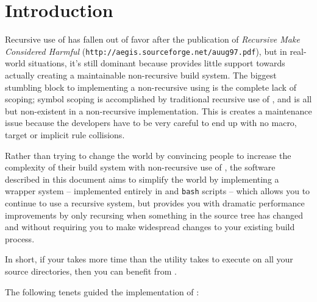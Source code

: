 %
%
%
%
\chapter{Introduction}

Recursive use of \make has fallen out of favor after the publication
of \emph{Recursive Make Considered Harmful}
(\texttt{http://aegis.sourceforge.net/auug97.pdf}), but in real-world
situations, it's still dominant because \make provides little support
towards actually creating a maintainable non-recursive build system.
The biggest stumbling block to implementing a non-recursive using
\make is the complete lack of scoping; symbol scoping is accomplished by
traditional recursive use of \make, and is all but non-existent in a
non-recursive implementation.  This is creates a maintenance issue
because the developers have to be very careful to end up with no
macro, target or implicit rule collisions.

Rather than trying to change the world by convincing people to
increase the complexity of their build system with non-recursive use
of \make, the software described in this document aims to simplify the
world by implementing a wrapper system -- implemented entirely in
\gnumake and \texttt{bash} scripts -- which allows you to continue to
use a recursive \make system, but provides you with dramatic
performance improvements by only recursing when something in the
source tree has changed and without requiring you to make widespread
changes to your existing build process.

In short, if your \nullbuild takes more time than the \mtree utility
takes to execute on all your source directories, then you can benefit
from \lmsbw.

The following tenets guided the implementation of \lmsbw:

